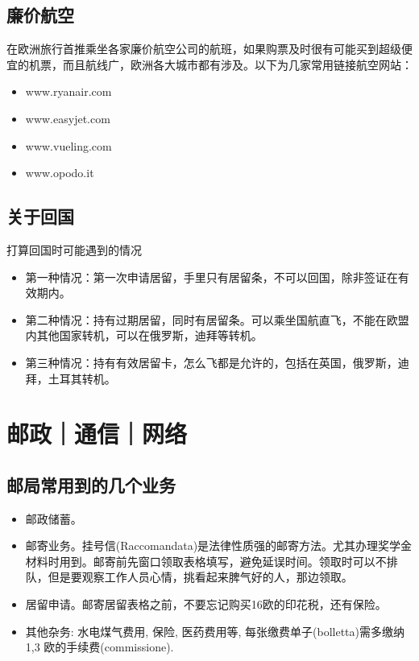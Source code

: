 \subsection{廉价航空}
在欧洲旅行首推乘坐各家廉价航空公司的航班，如果购票及时很有可能买到超级便宜的机票，而且航线广，欧洲各大城市都有涉及。以下为几家常用链接航空网站：
\begin{itemize}
\item www.ryanair.com
\item www.easyjet.com
\item www.vueling.com
\item www.opodo.it
\end{itemize}

\subsection{关于回国}
打算回国时可能遇到的情况
\begin{itemize}
\item 第一种情况：第一次申请居留，手里只有居留条，不可以回国，除非签证在有效期内。
\item 第二种情况：持有过期居留，同时有居留条。可以乘坐国航直飞，不能在欧盟内其他国家转机，可以在俄罗斯，迪拜等转机。
\item 第三种情况：持有有效居留卡，怎么飞都是允许的，包括在英国，俄罗斯，迪拜，土耳其转机。
\end{itemize}

\section{邮政｜通信｜网络}

\subsection{邮局常用到的几个业务}
\begin{itemize}
\item 邮政储蓄。
\item 邮寄业务。挂号信(Raccomandata)是法律性质强的邮寄方法。尤其办理奖学金材料时用到。邮寄前先窗口领取表格填写，避免延误时间。领取时可以不排队，但是要观察工作人员心情，挑看起来脾气好的人，那边领取。
\item 居留申请。邮寄居留表格之前，不要忘记购买16欧的印花税，还有保险。
\item 其他杂务: 水电煤气费用, 保险, 医药费用等, 每张缴费单子(bolletta)需多缴纳1,3 欧的手续费(commissione).

\end{itemize}

